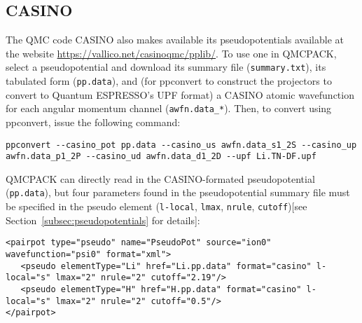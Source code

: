 \subsection{CASINO}
\label{subsec:CASINO}
The QMC code CASINO also makes available its pseudopotentials available at the website \url{https://vallico.net/casinoqmc/pplib/}. To use one in QMCPACK, select a pseudopotential and download its summary file (\texttt{summary.txt}), its tabulated form (\texttt{pp.data}), and (for ppconvert to construct the projectors to convert to Quantum ESPRESSO's UPF format) a CASINO atomic wavefunction for each angular momentum channel (\texttt{awfn.data\_*}).  Then, to convert using ppconvert, issue the following command:
\begin{lstlisting}[caption=Convert CASINO-formatted pseudopotential to Quantum ESPRESSO UPF format]
ppconvert --casino_pot pp.data --casino_us awfn.data_s1_2S --casino_up awfn.data_p1_2P --casino_ud awfn.data_d1_2D --upf Li.TN-DF.upf
\end{lstlisting}
QMCPACK can directly read in the CASINO-formated pseudopotential (\texttt{pp.data}), but four parameters found in the pseudopotential summary file must be specified in the pseudo element (\texttt{l-local}, \texttt{lmax}, \texttt{nrule}, \texttt{cutoff})[see Section~\ref{subsec:pseudopotentials} for details]:
\begin{lstlisting}[caption=XML syntax to use CASINO-formatted pseudopotentials in QMCPACK]
<pairpot type="pseudo" name="PseudoPot" source="ion0" wavefunction="psi0" format="xml">
   <pseudo elementType="Li" href="Li.pp.data" format="casino" l-local="s" lmax="2" nrule="2" cutoff="2.19"/>
   <pseudo elementType="H" href="H.pp.data" format="casino" l-local="s" lmax="2" nrule="2" cutoff="0.5"/>
</pairpot>
\end{lstlisting}
